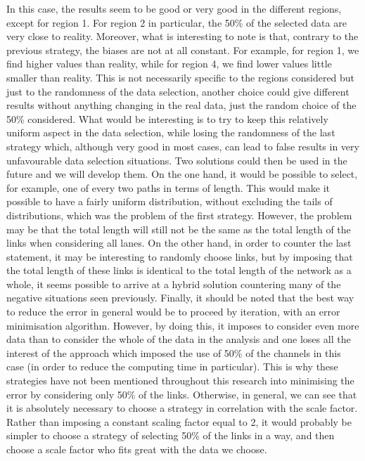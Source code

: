 \documentclass[a4paper, 12pt,oneside]{article}
\begin{document}
In this case, the results seem to be good or very good in the different regions, except for region 1. For region 2 in particular, the 50\% of the selected data are very close to reality. Moreover, what is interesting to note is that, contrary to the previous strategy, the biases are not at all constant. For example, for region 1, we find higher values than reality, while for region 4, we find lower values little smaller than reality. This is not necessarily specific to the regions considered but just to the randomness of the data selection, another choice could give different results without anything changing in the real data, just the random choice of the 50\% considered. 
\smallbreak
What would be interesting is to try to keep this relatively uniform aspect in the data selection, while losing the randomness of the last strategy which, although very good in most cases, can lead to false results in very unfavourable data selection situations. Two solutions could then be used in the future and we will develop them. On the one hand, it would be possible to select, for example, one of every two paths in terms of length. This would make it possible to have a fairly uniform distribution, without excluding the tails of distributions, which was the problem of the first strategy. However, the problem may be that the total length will still not be the same as the total length of the links when considering all lanes. On the other hand, in order to counter the last statement, it may be interesting to randomly choose links, but by imposing that the total length of these links is identical to the total length of the network as a whole, it seems possible to arrive at a hybrid solution countering many of the negative situations seen previously.
\bigbreak
Finally, it should be noted that the best way to reduce the error in general would be to proceed by iteration, with an error minimisation algorithm. However, by doing this, it imposes to consider even more data than to consider the whole of the data in the analysis and one loses all the interest of the approach which imposed the use of 50\% of the channels in this case (in order to reduce the computing time in particular). This is why these strategies have not been mentioned throughout this research into minimising the error by considering only 50\% of the links.
Otherwise, in general, we can see that it is absolutely necessary to choose a strategy in correlation with the scale factor. Rather than imposing a constant scaling factor equal to 2, it would probably be simpler to choose a strategy of selecting 50\% of the links in a way, and then choose a scale factor who fits great with the data we choose.
\end{document}

